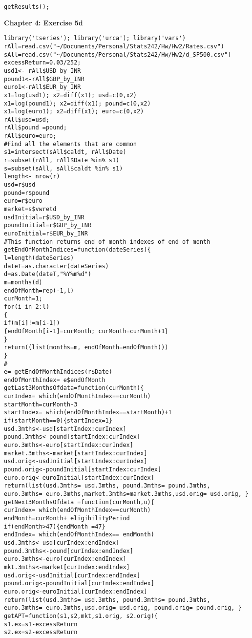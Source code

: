 \begin{small}
\begin{lstlisting}
getResults();
\end{lstlisting}
\textbf{Chapter 4: Exercise 5d}
\begin{lstlisting}
library('tseries'); library('urca'); library('vars')
rAll=read.csv("~/Documents/Personal/Stats242/Hw/Hw2/Rates.csv")
sAll=read.csv("~/Documents/Personal/Stats242/Hw/Hw2/d_SP500.csv")
excessReturn=0.03/252;
usd1<- rAll$USD_by_INR
pound1<-rAll$GBP_by_INR
euro1<-rAll$EUR_by_INR
x1=log(usd1); x2=diff(x1); usd=c(0,x2)
x1=log(pound1); x2=diff(x1); pound=c(0,x2)
x1=log(euro1); x2=diff(x1); euro=c(0,x2)
rAll$usd=usd;
rAll$pound =pound;
rAll$euro=euro;
#Find all the elements that are common
s1=intersect(sAll$caldt, rAll$Date)
r=subset(rAll, rAll$Date %in% s1)
s=subset(sAll, sAll$caldt %in% s1)
length<- nrow(r)
usd=r$usd
pound=r$pound
euro=r$euro
market=s$vwretd
usdInitial=r$USD_by_INR
poundInitial=r$GBP_by_INR
euroInitial=r$EUR_by_INR
#This function returns end of month indexes of end of month
getEndOfMonthIndices=function(dateSeries){
l=length(dateSeries)
dateT=as.character(dateSeries)
d=as.Date(dateT,"%Y%m%d")
m=months(d)
endOfMonth=rep(-1,l)
curMonth=1;
for(i in 2:l)
{
if(m[i]!=m[i-1])
{endOfMonth[i-1]=curMonth; curMonth=curMonth+1}
}
return((list(months=m, endOfMonth=endOfMonth)))
}
#
e= getEndOfMonthIndices(r$Date)
endOfMonthIndex= e$endOfMonth
getLast3MonthsOfdata=function(curMonth){
curIndex= which(endOfMonthIndex==curMonth)
startMonth=curMonth-3
startIndex= which(endOfMonthIndex==startMonth)+1
if(startMonth==0){startIndex=1}
usd.3mths<-usd[startIndex:curIndex]
pound.3mths<-pound[startIndex:curIndex]
euro.3mths<-euro[startIndex:curIndex]
market.3mths<-market[startIndex:curIndex]
usd.orig<-usdInitial[startIndex:curIndex]
pound.orig<-poundInitial[startIndex:curIndex]
euro.orig<-euroInitial[startIndex:curIndex]
return(list(usd.3mths= usd.3mths, pound.3mths= pound.3mths, euro.3mths= euro.3mths,market.3mths=market.3mths,usd.orig= usd.orig, }
getNext3MonthsOfdata =function(curMonth,u){
curIndex= which(endOfMonthIndex==curMonth)
endMonth=curMonth+ eligibilityPeriod
if(endMonth>47){endMonth =47}
endIndex= which(endOfMonthIndex== endMonth)
usd.3mths<-usd[curIndex:endIndex]
pound.3mths<-pound[curIndex:endIndex]
euro.3mths<-euro[curIndex:endIndex]
mkt.3mths<-market[curIndex:endIndex]
usd.orig<-usdInitial[curIndex:endIndex]
pound.orig<-poundInitial[curIndex:endIndex]
euro.orig<-euroInitial[curIndex:endIndex]
return(list(usd.3mths= usd.3mths, pound.3mths= pound.3mths, euro.3mths= euro.3mths,usd.orig= usd.orig, pound.orig= pound.orig, }
getAPT=function(s1,s2,mkt,s1.orig, s2.orig){
s1.ex=s1-excessReturn
s2.ex=s2-excessReturn

\end{lstlisting}
\end{small}
